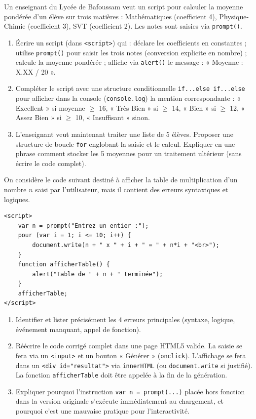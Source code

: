 \documentclass[11pt]{article}
\begin{document}
\begin{exercice}
Un enseignant du Lycée de Bafoussam veut un script pour calculer la moyenne pondérée d'un élève sur trois matières : Mathématiques (coefficient 4), Physique-Chimie (coefficient 3), SVT (coefficient 2). Les notes sont saisies via \texttt{prompt()}.
\begin{enumerate}
    \item Écrire un script (dans \texttt{<script>}) qui : déclare les coefficients en constantes ; utilise \texttt{prompt()} pour saisir les trois notes (conversion explicite en nombre) ; calcule la moyenne pondérée ; affiche via \texttt{alert()} le message : « Moyenne : X.XX / 20 ».
    \item Compléter le script avec une structure conditionnelle \texttt{if...else if...else} pour afficher dans la console (\texttt{console.log}) la mention correspondante : « Excellent » si moyenne $\ge$ 16, « Très Bien » si $\ge$ 14, « Bien » si $\ge$ 12, « Assez Bien » si $\ge$ 10, « Insuffisant » sinon.
    \item L'enseignant veut maintenant traiter une liste de 5 élèves. Proposer une structure de boucle \texttt{for} englobant la saisie et le calcul. Expliquer en une phrase comment stocker les 5 moyennes pour un traitement ultérieur (sans écrire le code complet).
\end{enumerate}
\end{exercice}

\begin{exercice}
On considère le code suivant destiné à afficher la table de multiplication d'un nombre $n$ saisi par l'utilisateur, mais il contient des erreurs syntaxiques et logiques.
\begin{verbatim}
<script>
    var n = prompt("Entrez un entier :");
    pour (var i = 1; i <= 10; i++) {
        document.write(n + " x " + i + " = " + n*i + "<br>");
    }
    function afficherTable() {
        alert("Table de " + n + " terminée");
    }
    afficherTable;
</script>
\end{verbatim}
\begin{enumerate}
    \item Identifier et lister précisément les 4 erreurs principales (syntaxe, logique, événement manquant, appel de fonction).
    \item Réécrire le code corrigé complet dans une page HTML5 valide. La saisie se fera via un \texttt{<input>} et un bouton « Générer » (\texttt{onclick}). L'affichage se fera dans un \texttt{<div id="resultat">} via \texttt{innerHTML} (ou \texttt{document.write} si justifié). La fonction \texttt{afficherTable} doit être appelée à la fin de la génération.
    \item Expliquer pourquoi l'instruction \texttt{var n = prompt(...)} placée hors fonction dans la version originale s'exécute immédiatement au chargement, et pourquoi c'est une mauvaise pratique pour l'interactivité.
\end{enumerate}
\end{exercice}
\end{document}
